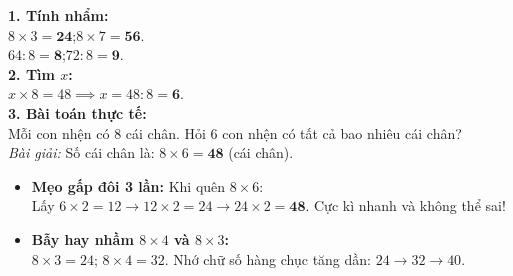 \documentclass[12pt,a4paper]{article}
\begin{document}
\vspace{-2.5mm}
\noindent
\begin{minipage}[t]{0.49\textwidth}\vspace{0pt}
\begin{tcolorbox}[
  enhanced,
  colback=green!4!white,
  colframe=green!60!black,
  arc=2mm, boxrule=0.8pt,
  left=2mm, right=2mm, top=1.8mm, bottom=1.8mm,
  title={\footnotesize\bfseries\color{white}\faCheckCircle\ Ví dụ thực hành chuẩn mực}
]
{\footnotesize
\textbf{1. Tính nhẩm:}\\
$8 \times 3 = \mathbf{24}$;\quad $8 \times 7 = \mathbf{56}$.\\
$64 : 8 = \mathbf{8}$;\quad $72 : 8 = \mathbf{9}$.\\
\textbf{2. Tìm $x$:}\\
$x \times 8 = 48 \implies x = 48 : 8 = \mathbf{6}$.\\
\textbf{3. Bài toán thực tế:}\\
Mỗi con nhện có $8$ cái chân. Hỏi $6$ con nhện có tất cả bao nhiêu cái chân?\\
\textit{Bài giải:} Số cái chân là: $8 \times 6 = \mathbf{48}$ (cái chân).
}
\end{tcolorbox}
\end{minipage}
\hfill
\begin{minipage}[t]{0.49\textwidth}\vspace{0pt}
\begin{tcolorbox}[
  enhanced,
  colback=red!4!white,
  colframe=red!70!black,
  arc=2mm, boxrule=0.8pt,
  left=2mm, right=2mm, top=1.8mm, bottom=1.8mm,
  title={\footnotesize\bfseries\color{white}\faExclamationTriangle\ Mẹo tránh bẫy trắc nghiệm}
]
{\footnotesize
\begin{itemize}\setlength{\itemsep}{1.5pt}\setlength{\leftskip}{-2.5mm}
  \item \textbf{Mẹo gấp đôi 3 lần:} Khi quên $8 \times 6$:\\
  Lấy $6 \times 2 = 12 \to 12 \times 2 = 24 \to 24 \times 2 = \mathbf{48}$. Cực kì nhanh và không thể sai!
  \item \textbf{Bẫy hay nhầm $8 \times 4$ và $8 \times 3$:}\\
  $8 \times 3 = 24$; $8 \times 4 = 32$. Nhớ chữ số hàng chục tăng dần: $24 \to 32 \to 40$.
\end{itemize}
}
\end{tcolorbox}
\end{minipage}
\end{document}
